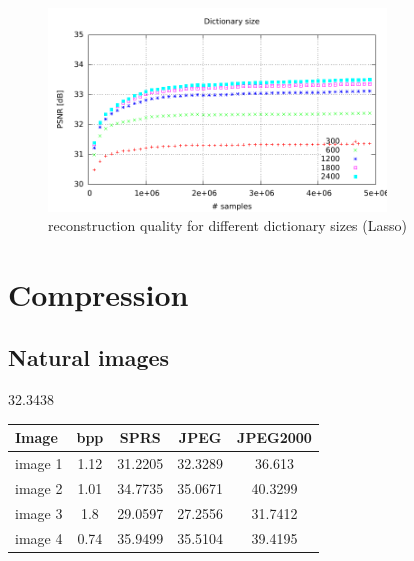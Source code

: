 \begin{figure}[h]
\centering
\includegraphics[width = 0.8\textwidth]{../tests/results/dictSizeLasso.pdf}
\caption{reconstruction quality for different dictionary sizes (Lasso)}
\label{fig:dict size}
\end{figure}


\newpage
\section{Compression}
\subsection{Natural images}


32.3438

\begin{table}[H]
\centering
\begin{tabular}{| l c | c | c | c|}
\hline\hline
Image & bpp & SPRS & JPEG & JPEG2000 \\
\hline
image 1 & 1.12 & 31.2205 & 32.3289 & 36.613 \\
image 2 & 1.01 & 34.7735 & 35.0671 & 40.3299 \\
image 3 & 1.8  & 29.0597 & 27.2556 & 31.7412 \\
image 4 & 0.74  & 35.9499 & 35.5104 & 39.4195 \\

\hline
\end{tabular}
\end{table}

